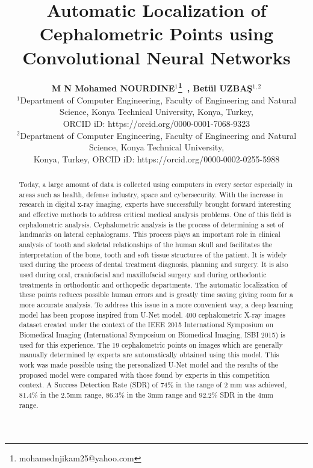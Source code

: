 \documentclass{elektr}
\title{Automatic Localization of Cephalometric Points using Convolutional Neural Networks}
\author[M N Mohamed NOURDINE and Betül UZBAŞ]{
\textbf{M N Mohamed NOURDINE$^{1}$\thanks{mohamednjikam25@yahoo.com}~, Betül UZBAŞ$^{1,2}$}\\
$^{1}$Department of Computer Engineering, Faculty of Engineering and Natural Science, Konya Technical University, Konya, Turkey, \\ ORCID iD: https://orcid.org/0000-0001-7068-9323\\
$^{2}$Department of Computer Engineering, Faculty of Engineering and Natural Science, Konya Technical University,\\ Konya, Turkey, ORCID iD: https://orcid.org/0000-0002-0255-5988
\\ [1.8em]

\rec{.201}
\acc{.201}
\finv{..201}
}
\begin{document}
\maketitle


\begin{abstract}Today, a large amount of data is collected using computers in every sector especially in areas such as health, defense industry, space and cybersecurity. With the increase in research in digital x-ray imaging, experts have successfully brought forward interesting and effective methods to address critical medical analysis problems. One of this field is cephalometric analysis. Cephalometric analysis is the process of determining a set of landmarks on lateral cephalograms. This process plays an important role in clinical analysis of tooth and skeletal relationships of the human skull and facilitates the interpretation of the bone, tooth and soft tissue structures of the patient. It is widely used during the process of dental treatment diagnosis, planning and surgery. It is also used during oral, craniofacial and maxillofacial surgery and during orthodontic treatments in orthodontic and orthopedic departments. The automatic localization of these points reduces possible human errors and is greatly time saving giving room for a more accurate analysis. To address this issue in a more convenient way, a deep learning model has been propose inspired from U-Net model. 400 cephalometric X-ray images dataset created under the context of the IEEE 2015 International Symposium on Biomedical Imaging (International Symposium on Biomedical Imaging, ISBI 2015) is used for this experience. The 19 cephalometric points on images which are generally manually determined by experts are automatically obtained using this model. This work was made possible using the personalized U-Net model and the results of the proposed model were compared with those found by experts in this competition context. A Success Detection Rate (SDR) of 74$\%$  in the range of 2 mm was achieved, 81.4$\%$  in the 2.5mm range, 86.3$\%$  in the 3mm range and 92.2$\%$  SDR in the 4mm range.
	

\end{abstract}
\end{document}
